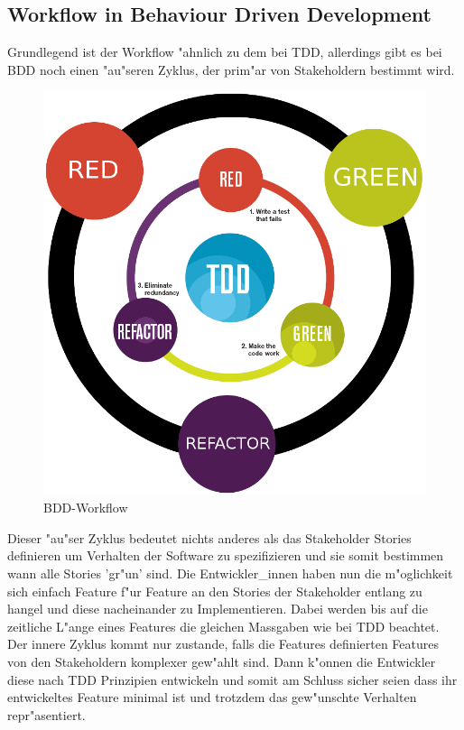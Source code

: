 \documentclass[runningheads,a4paper]{llncs}
\begin{document}
  \subsection{Workflow in Behaviour Driven Development}
    Grundlegend ist der Workflow "ahnlich zu dem bei TDD, allerdings gibt es 
    bei BDD noch einen "au"seren Zyklus, der prim"ar von Stakeholdern bestimmt wird.
    \begin{figure}
      \vspace{-30pt}
      \begin{center}
        \includegraphics[scale=0.3]{assets/bdd_flow.png}
      \end{center}
      \caption{BDD-Workflow}
      \vspace{-15pt}
    \end{figure}
    Dieser "au"ser Zyklus bedeutet nichts anderes als das Stakeholder Stories
    definieren um Verhalten der Software zu spezifizieren und sie somit bestimmen
    wann alle Stories 'gr"un' sind. Die Entwickler\_innen haben nun die m"oglichkeit sich einfach Feature f"ur Feature an den Stories der Stakeholder entlang zu 
    hangel und diese nacheinander zu Implementieren. Dabei werden bis auf die 
    zeitliche L"ange eines Features die gleichen Massgaben wie bei TDD beachtet.\\
    Der innere Zyklus kommt nur zustande, falls die Features definierten Features
    von den Stakeholdern komplexer gew"ahlt sind. Dann k"onnen die Entwickler 
    diese nach TDD Prinzipien entwickeln und somit am Schluss sicher seien 
    dass ihr entwickeltes Feature minimal ist und trotzdem das gew"unschte 
    Verhalten repr"asentiert.\\
\end{document}
